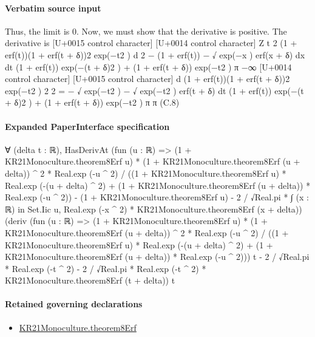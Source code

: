 \documentclass[10pt]{article}
\begin{document}
\paragraph{Verbatim source input}
\begin{ReviewVerbatim}
Thus, the limit is 0. Now, we must show that the derivative is positive. The derivative is
[U+0015 control character]
[U+0014 control character]
Z t
2
(1 + erf(t))(1 + erf(t + δ))2 exp(−t2 )
d
2
− (1 + erf(t)) − √
exp(−x ) erf(x + δ) dx
dt (1 + erf(t)) exp(−(t + δ)2 ) + (1 + erf(t + δ)) exp(−t2 )
π −∞
[U+0014 control character]
[U+0015 control character]
d
(1 + erf(t))(1 + erf(t + δ))2 exp(−t2 )
2
2
=
− √ exp(−t2 ) − √ exp(−t2 ) erf(t + δ)
dt (1 + erf(t)) exp(−(t + δ)2 ) + (1 + erf(t + δ)) exp(−t2 )
π
π
(C.8)
\end{ReviewVerbatim}



\paragraph{Expanded PaperInterface specification}
\begin{ReviewVerbatim}
∀ (delta t : ℝ),
  HasDerivAt
    (fun (u : ℝ) =>
      (1 + KR21Monoculture.theorem8Erf u) * (1 + KR21Monoculture.theorem8Erf (u + delta)) ^ 2 * Real.exp (-u ^ 2) /
            ((1 + KR21Monoculture.theorem8Erf u) * Real.exp (-(u + delta) ^ 2) +
              (1 + KR21Monoculture.theorem8Erf (u + delta)) * Real.exp (-u ^ 2)) -
          (1 + KR21Monoculture.theorem8Erf u) -
        2 / √Real.pi * ∫ (x : ℝ) in Set.Iic u, Real.exp (-x ^ 2) * KR21Monoculture.theorem8Erf (x + delta))
    (deriv
          (fun (u : ℝ) =>
            (1 + KR21Monoculture.theorem8Erf u) * (1 + KR21Monoculture.theorem8Erf (u + delta)) ^ 2 *
                Real.exp (-u ^ 2) /
              ((1 + KR21Monoculture.theorem8Erf u) * Real.exp (-(u + delta) ^ 2) +
                (1 + KR21Monoculture.theorem8Erf (u + delta)) * Real.exp (-u ^ 2)))
          t -
        2 / √Real.pi * Real.exp (-t ^ 2) -
      2 / √Real.pi * Real.exp (-t ^ 2) * KR21Monoculture.theorem8Erf (t + delta))
    t
\end{ReviewVerbatim}

\paragraph{Retained governing declarations}
\begin{itemize}\raggedright
\item \hyperlink{paper-prerequisite-89a4972e4c2bbebd}{KR21\allowbreak{}Monoculture.\allowbreak{}theorem8\allowbreak{}Erf}
\end{itemize}
\end{document}
